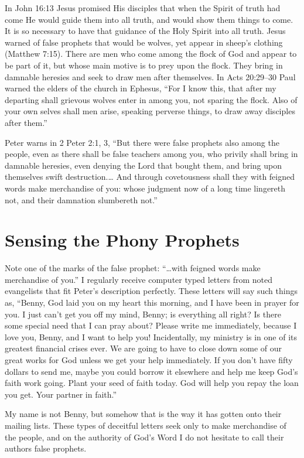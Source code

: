 In John 16:13 Jesus promised His disciples that when
the Spirit of truth had come He would guide them into all
truth, and would show them things to come. It is so necessary
to have that guidance of the Holy Spirit into all truth.
Jesus warned of false prophets that would be wolves, yet
appear in sheep’s clothing (Matthew 7:15). There are men
who come among the flock of God and appear to be part of
it, but whose main motive is to prey upon the flock. They
bring in damnable heresies and seek to draw men after
themselves. In Acts 20:29–30 Paul warned the elders of the
church in Ephesus, “For I know this, that after my departing
shall grievous wolves enter in among you, not sparing
the flock. Also of your own selves shall men arise, speaking
perverse things, to draw away disciples after them.”

Peter warns in 2 Peter 2:1, 3, “But there were false prophets
also among the people, even as there shall be false teachers
among you, who privily shall bring in damnable heresies,
even denying the Lord that bought them, and bring
upon themselves swift destruction.… And through covetousness
shall they with feigned words make merchandise
of you: whose judgment now of a long time lingereth not,
and their damnation slumbereth not.”


\section*{Sensing the Phony Prophets}

Note one of the marks of the false prophet: “…with
feigned words make merchandise of you.” I regularly
receive computer typed letters from noted evangelists that
fit Peter’s description perfectly. These letters will say such
things as, “Benny, God laid you on my heart this morning,
and I have been in prayer for you. I just can’t get you off my
mind, Benny; is everything all right? Is there some special
need that I can pray about? Please write me immediately,
because I love you, Benny, and I want to help you! Incidentally,
my ministry is in one of its greatest financial crises
ever. We are going to have to close down some of our great
works for God unless we get your help immediately. If
you don’t have fifty dollars to send me, maybe you could
borrow it elsewhere and help me keep God’s faith work
going. Plant your seed of faith today. God will help you
repay the loan you get. Your partner in faith.”

My name is not Benny, but somehow that is the way it
has gotten onto their mailing lists. These types of deceitful
letters seek only to make merchandise of the people, and on
the authority of God’s Word I do not hesitate to call their
authors false prophets.

